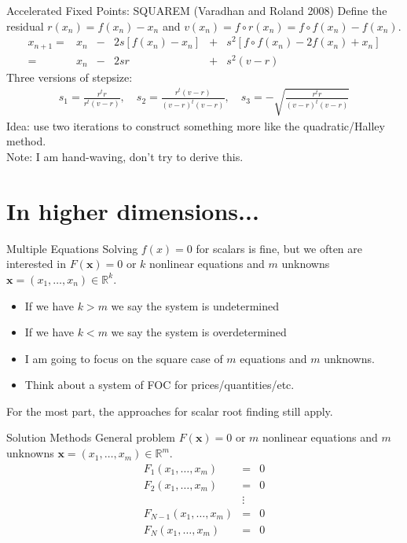 \documentclass[xcolor=pdftex,dvipsnames,table,mathserif,aspectratio=169]{beamer}
\begin{document}
\begin{frame}{Accelerated Fixed Points: SQUAREM (Varadhan and Roland 2008)}
Define the residual $r(x_n) = f(x_n) - x_n$ and $v(x_n)=f \circ r \left(x_{n}\right)=f \circ f \left(x_{n}\right)-f\left(x_{n}\right)$.
\begin{align*}
x_{n+1}=& x_{n}&-&2 s\left[f\left(x_{n}\right)-x_{n}\right] &+&s^{2}\left[f \circ f\left(x_{n}\right)-2 f\left(x_{n}\right)+x_{n}\right] \\
=& x_{n}&-&2 s r &+&s^{2}(v-r)
\end{align*}
Three versions of stepsize:
\begin{align*}
s_1 =\frac{r^{t} r}{r^{t}(v-r)}, \quad
s_2 =\frac{r^{t}(v-r)}{(v-r)^{t}(v-r)}, \quad
s_3 =-\sqrt{\frac{r^{t} r}{(v-r)^{t}(v-r)}}
\end{align*}
Idea: use two iterations to construct something more like the quadratic/Halley method.\\
\alert{Note: I am hand-waving, don't try to derive this.}
\end{frame}

\section{In higher dimensions...}

\begin{frame}{Multiple Equations}
Solving $f(x) = 0$ for scalars is fine, but we often are interested in $F(\mathbf{x}) = 0$ or $k$ nonlinear equations and $m$ unknowns $\mathbf{x} = (x_1,\ldots, x_n) \in \mathbb{R}^k$.
\begin{itemize}
\item If we have $k>m$ we say the system is \alert{undetermined}
\item If we have $k<m$ we say the system is \alert{overdetermined}
\item I am going to focus on the \alert{square} case of $m$ equations and $m$ unknowns.
\item Think about a system of FOC for prices/quantities/etc.
\end{itemize}
For the most part, the approaches for scalar root finding still apply.
\end{frame}

\begin{frame}{Solution Methods}
\vspace{0.5cm}
General problem $F(\mathbf{x}) = 0$ or $m$ nonlinear equations and $m$ unknowns $\mathbf{x} = (x_1,\ldots, x_m) \in \mathbb{R}^m$.
\begin{eqnarray*}
F_1 (x_1,\ldots, x_m)  &=& 0 \\
F_2 (x_1,\ldots, x_m)  &=& 0\\
&\vdots&\\ 
F_{N-1} (x_1,\ldots, x_m)  &=& 0\\
F_N (x_1,\ldots, x_m)  &=& 0\\
\end{eqnarray*}
\end{frame} 
\end{document}
